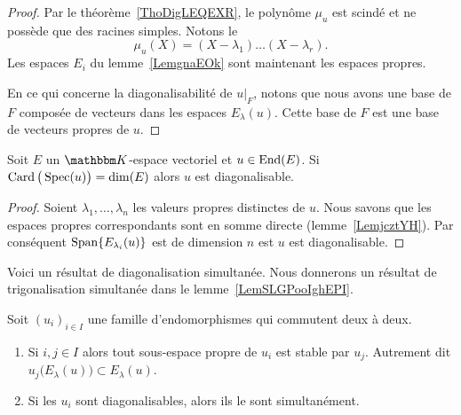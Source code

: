 \begin{proof}
    Par le théorème~\ref{ThoDigLEQEXR}, le polynôme \( \mu_u\) est scindé et ne possède que des racines simples. Notons le
    \begin{equation}
        \mu_u(X)=(X-\lambda_1)\ldots (X-\lambda_r).
    \end{equation}
    Les espaces \( E_i\) du lemme~\ref{LemgnaEOk} sont maintenant les espaces propres.

    En ce qui concerne la diagonalisabilité de \( u|_F\), notons que nous avons une base de \( F\) composée de vecteurs dans les espaces \( E_{\lambda}(u)\). Cette base de \( F\) est une base de vecteurs propres de \( u\).
\end{proof}

\begin{lemma}
    Soit \( E\) un \( \eK\)-espace vectoriel et \( u\in\operatorname{End}(E)\). Si \( \operatorname{Card}\big( \operatorname{Spec}(u) \big)=\dim(E)\) alors \( u\) est diagonalisable.
\end{lemma}

\begin{proof}
    Soient \( \lambda_1,\ldots, \lambda_n\) les valeurs propres distinctes de \( u\). Nous savons que les espaces propres correspondants sont en somme directe (lemme~\ref{LemjcztYH}). Par conséquent \( \operatorname{Span}\{ E_{\lambda_i}(u) \}\) est de dimension \( n\) est \( u\) est diagonalisable.
\end{proof}

Voici un résultat de diagonalisation simultanée. Nous donnerons un résultat de trigonalisation simultanée dans le lemme~\ref{LemSLGPooIghEPI}.
\begin{proposition}     \label{PropGqhAMei}
    Soit \( (u_i)_{i\in I}\) une famille d'endomorphismes qui commutent deux à deux.
    \begin{enumerate}
        \item       \label{ItemGqhAMei}
            Si \( i,j\in I\) alors tout sous-espace propre de \( u_i\) est stable par \( u_j\). Autrement dit \( u_j\big(E_{\lambda}(u)\big)\subset E_{\lambda}(u)\).
        \item
            Si les \( u_i\) sont diagonalisables, alors ils le sont simultanément.
    \end{enumerate}
\end{proposition}


